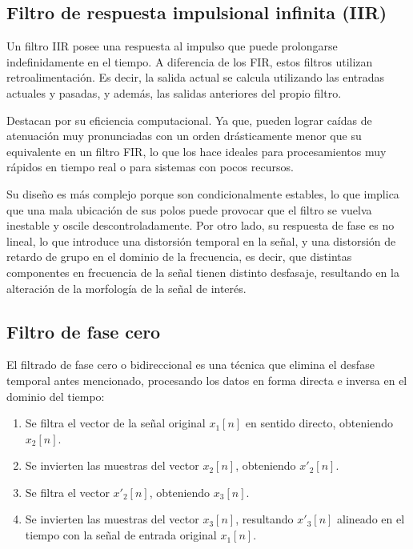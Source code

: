 \subsection{Filtro de respuesta impulsional infinita (IIR)}

Un filtro IIR \cite{siemens_fir_iir} posee una respuesta al impulso que puede prolongarse indefinidamente en el tiempo.
A diferencia de los FIR, estos filtros utilizan retroalimentación. Es decir, la salida actual se calcula utilizando las entradas actuales y pasadas, y además, las salidas anteriores del propio filtro.

Destacan por su eficiencia computacional. Ya que, pueden lograr caídas de atenuación muy pronunciadas con un orden drásticamente menor que su equivalente en un filtro FIR, lo que los hace ideales para procesamientos muy rápidos en tiempo real o para sistemas con pocos recursos.

Su diseño es más complejo porque son condicionalmente estables, lo que implica que una mala ubicación de sus polos puede provocar que el filtro se vuelva inestable y oscile descontroladamente. Por otro lado, su respuesta de fase es no lineal, lo que introduce una distorsión temporal en la señal, y una distorsión de retardo de grupo en el dominio de la frecuencia, es decir, que distintas componentes en frecuencia de la señal tienen distinto desfasaje, resultando en la alteración de la morfología de la señal de interés.

\subsection{Filtro de fase cero}

El filtrado de fase cero \cite{Lyons2004} o bidireccional es una técnica que elimina el desfase temporal antes mencionado, procesando los datos en forma directa e inversa en el dominio del tiempo:
\begin{enumerate}
    \item Se filtra el vector de la señal original $x_1[n]$ en sentido directo, obteniendo $x_2[n]$.
    \item Se invierten las muestras del vector $x_2[n]$, obteniendo $x'_2[n]$.
    \item Se filtra el vector $x'_2[n]$, obteniendo $x_3[n]$.
    \item Se invierten las muestras del vector $x_3[n]$, resultando $x'_3[n]$ alineado en el tiempo con la señal de entrada original $x_1[n]$.
\end{enumerate}

